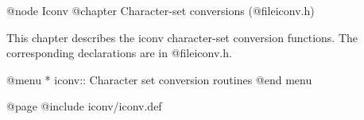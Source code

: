 @node Iconv
@chapter Character-set conversions (@file{iconv.h})

This chapter describes the iconv character-set conversion functions.
The corresponding declarations are in
@file{iconv.h}.

@menu
* iconv::	Character set conversion routines
@end menu

@page
@include iconv/iconv.def

